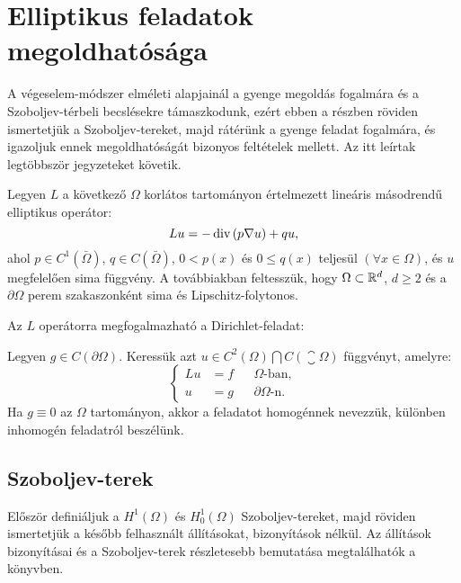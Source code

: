 \section{Elliptikus feladatok megoldhatósága}\label{sec:elliptikus}


A végeselem-módszer elméleti alapjainál a gyenge megoldás fogalmára és a Szoboljev-térbeli becslésekre támaszkodunk, ezért ebben a részben röviden ismertetjük  a Szoboljev-tereket, majd rátérünk a gyenge feladat fogalmára, és igazoljuk ennek megoldhatóságát bizonyos feltételek mellett. Az itt leírtak legtöbbször  jegyzeteket követik. 


Legyen $L$ a következő $\Omega$ korlátos tartományon értelmezett lineáris másodrendű elliptikus operátor:
\begin{equation}\label{L_op}
	Lu = -\operatorname{div}\left(p \nabla u \right) + q u,
\end{equation}
ahol $p \in C^1(\bar{\Omega})$, $q \in C(\bar{\Omega})$, $ 0 < p(x) $ és  $ 0 \leq q(x) $ teljesül $(\forall x \in \Omega)$, és $u$ megfelelően sima függvény.  A továbbiakban feltesszük, hogy $\Omega \subset \mathbb{R}^d$, $d \geq 2$ és a $\partial\Omega$ perem szakaszonként sima és Lipschitz-folytonos.

Az $L$ operátorra megfogalmazható a Dirichlet-feladat:
\begin{definition}
Legyen $g \in C(\partial\Omega)$. Keressük azt  $u \in C^2(\Omega) \bigcap C(\closure{\Omega})$ függvényt, amelyre:
	\begin{equation}\label{dirichlet_problem}		
		\left\{
		\begin{aligned}
			Lu &= f && \Omega \text{-ban}, \\
			u &= g & &\partial\Omega \text{-n}.
		\end{aligned}
		\right.
	\end{equation}
	 Ha $g \equiv 0$ az $\Omega$ tartományon, akkor a feladatot homogénnek nevezzük, különben inhomogén feladatról beszélünk.
\end{definition}


\subsection{Szoboljev-terek}

Először definiáljuk a $H^1(\Omega)$ és  $H^1_0(\Omega)$ Szoboljev-tereket, majd röviden ismertetjük a később felhasznált állításokat, bizonyítások nélkül. Az állítások bizonyításai és a Szoboljev-terek részletesebb bemutatása megtalálhatók a \cite{besenyei} könyvben.

